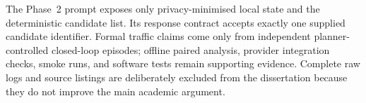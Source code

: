 \documentclass[letterpaper,10pt,conference]{ieeeconf}
\begin{document}
The Phase~2 prompt exposes only privacy-minimised local state and the deterministic candidate list. Its response contract accepts exactly one supplied candidate identifier. Formal traffic claims come only from independent planner-controlled closed-loop episodes; offline paired analysis, provider integration checks, smoke runs, and software tests remain supporting evidence. Complete raw logs and source listings are deliberately excluded from the dissertation because they do not improve the main academic argument.






\end{document}
